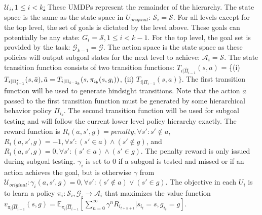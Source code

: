 \documentclass{article} %
\begin{document}
\underline{$\mathcal{U}_i, 1 \leq i<k$:} These UMDPs represent the remainder of the hierarchy.  The state space is the same as the state space in $U_{original}$: $\mathcal{S}_i=\mathcal{S}$.  For all levels except for the top level, the set of goals is dictated by the level above.  These goals can potentially be any state: $G_i=\mathcal{S}, 1 \leq i < k-1$.  For the top level, the goal set is provided by the task: $\mathcal{G}_{k-1}=\mathcal{G}$.  The action space is the state space as these policies will output subgoal states for the next level to achieve: $\mathcal{A}_i=\mathcal{S}$.  The state transition function consists of two transition functions: $T_{i|\hat{\Pi}_{i-1}}(s,a)$ = \{(i) $T_{i|\Pi_{i-1}^*}(s,\Bar{a}), \Bar{a} = T_{i|\Pi_{i-1_b}}(s,\pi_{i_b}(s,g_i))$, (ii) $T_{i|\Pi_{i-1}}(s,a)\}$.  The first transition function will be used to generate hindsight transitions. Note that the action $\Bar{a}$ passed to the first transition function must be generated by some hierarchical behavior policy $\Pi_{i_b}$.  The second transition function will be used for subgoal testing and will follow the current lower level policy hierarchy exactly.  The reward function is $R_i(a,s',g)=penalty, \forall s': s' \notin a$, $R_i(a,s',g)=-1, \forall s': (s' \in a) \land (s' \notin g)$, and $R_i(a,s',g)=0, \forall s': (s' \in a) \land (s' \in g)$.  The penalty reward is only issued during subgoal testing.  $\gamma_i$ is set to 0 if a subgoal is tested and missed or if an action achieves the goal, but is otherwise $\gamma$ from $\mathcal{U}_{original}: \gamma_i(a,s',g)=0, \forall s': (s' \notin a) \lor (s' \in g)$.  The objective in each $U_i$ is to learn a policy $\pi_i: \mathcal{S}_i,\mathcal{G}_i \rightarrow \mathcal{A}_i$ that maximizes the value function $v_{\pi_i|\hat{\Pi}_{i-1}}(s,g)=\mathbb{E}_{\pi_i|\hat{\Pi}_{i-1}}[\sum\nolimits_{n=0}^\infty \gamma^n R_{i_{t+n+1}}|s_{i_t}=s, g_{i_t}=g]$.
\end{document}
